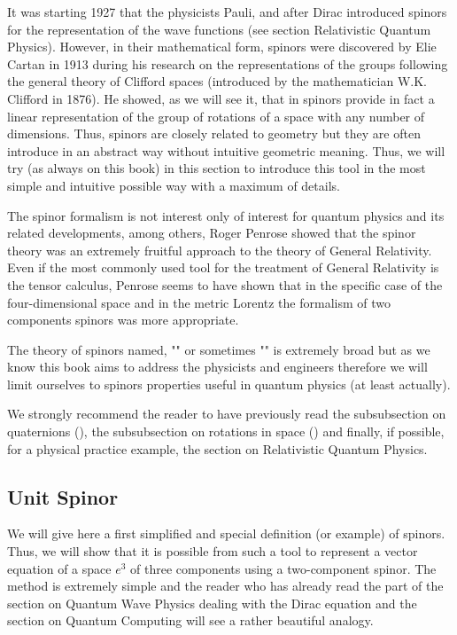 	It was starting 1927 that the physicists Pauli, and after Dirac introduced spinors  for the representation of the wave functions (see section Relativistic Quantum Physics). However, in their mathematical form, spinors were discovered by Elie Cartan in 1913 during his research on the representations of the groups following the general theory of Clifford spaces (introduced by the mathematician W.K. Clifford in 1876). He showed, as we will see it, that in spinors provide in fact a linear representation of the group of rotations of a space with any number of dimensions. Thus, spinors are closely related to geometry but they are often introduce in an abstract way without intuitive geometric meaning. Thus, we will try (as always on this book) in this section to introduce this tool in the most simple and intuitive possible way with a maximum of details.
	
	The spinor formalism is not interest only of interest for quantum physics and its related developments, among others, Roger Penrose showed that the spinor theory was an extremely fruitful approach to the theory of General Relativity. Even if the most commonly used tool for the treatment of General Relativity is the tensor calculus, Penrose seems to have shown that in the specific case of the four-dimensional space and in the metric Lorentz the formalism of two components spinors was more appropriate.
	
	The theory of spinors named, "" or sometimes "" is extremely broad but as we know this book aims to address the physicists and engineers therefore we will limit ourselves to spinors properties useful in quantum physics (at least actually).
	
	\begin{tcolorbox}[title=Remark,colframe=black,arc=10pt]
We strongly recommend the reader to have previously read the subsubsection on quaternions (), the subsubsection on rotations in space () and finally, if possible, for a physical practice example, the section on Relativistic Quantum Physics.
	\end{tcolorbox}
	
	\pagebreak
	\subsection{Unit Spinor}
	
	We will give here a first simplified and special definition (or example) of spinors. Thus, we will show that it is possible from such a tool to represent a vector equation of a space $e^3$ of three components using a two-component spinor. The method is extremely simple and the reader who has already read the part of the section on Quantum Wave Physics dealing with the Dirac equation and the section on Quantum Computing will see a rather beautiful analogy.
	
